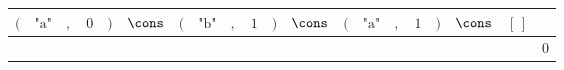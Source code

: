 {\scriptsize\setlength{\tabcolsep}{1.5pt}%
\begin{tabular}{ccccccccccccccccccc|l}
$($ & $\text{"a"}$ & $,$ & $\text{0}$ & $)$ & $\cons$ & $($ & $\text{"b"}$ & $,$ & $\text{1}$ & $)$ & $\cons$ & $($ & $\text{"a"}$ & $,$ & $\text{1}$ & $)$ & $\cons$ & $[\,]$ & \\ \hline
\gcell{$$} & \gcell{$$} & \gcell{$$} & \gcell{$$} & \gcell{$$} & \gcell{$$} & \gcell{$$} & \gcell{$$} & \gcell{$$} & \gcell{$$} & \gcell{$$} & \gcell{$$} & \gcell{$$} & \gcell{$$} & \gcell{$$} & \gcell{$$} & \gcell{$$} & \gcell{$$} & \gcell{$$} & $\text{0}$ \\
\end{tabular}}
